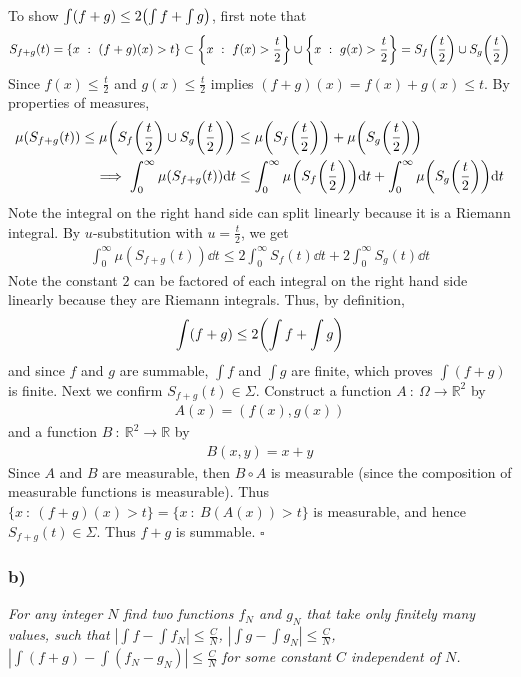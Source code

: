 \documentclass[12pt]{article}
\theoremstyle{plain}
\begin{document}
To show $\int (f + g) \leq 2\qty(\int f + \int g)$, first note that
\begin{align*}
    S_{f + g}(t) = \{x\ :\ (f+g)(x) > t\} \subset \left\{x\ :\ f(x) > \frac{t}{2}\right\} \cup \left\{x\ :\ g(x) > \frac{t}{2}\right\} = S_f\qty(\frac{t}{2}) \cup S_g\qty(\frac{t}{2})
\end{align*}
Since $f(x) \leq \frac{t}{2}$ and $g(x) \leq \frac{t}{2}$ implies $(f + g)(x) = f(x) + g(x) \leq t$.  By properties of measures, 
\begin{align*}
    \mu(S_{f + g}(t)) \leq \mu\qty(S_f\qty(\frac{t}{2}) \cup S_g\qty(\frac{t}{2})) &\leq \mu\qty(S_f\qty(\frac{t}{2})) + \mu\qty(S_g\qty(\frac{t}{2})) \\
    \implies \int_0^\infty \mu(S_{f + g}(t)) \dd t &\leq \int_0^\infty \mu\qty(S_f\qty(\frac{t}{2}))\dd t + \int_0^\infty \mu\qty(S_g\qty(\frac{t}{2}))\dd t
\end{align*}
Note the integral on the right hand side can split linearly because it is a Riemann integral.  By $u$-substitution with $u = \frac{t}{2}$, we get
\begin{align*}
    \int_0^\infty \mu(S_{f + g}(t))\dd t \leq 2\int_0^\infty S_f(t)\dd t + 2\int_0^\infty S_g(t)\dd t
\end{align*}
Note the constant $2$ can be factored of each integral on the right hand side linearly because they are Riemann integrals.  Thus, by definition,
\begin{align*}
    \int (f + g) \leq 2\qty(\int f + \int g)
\end{align*}
and since $f$ and $g$ are summable, $\int f$ and $\int g$ are finite, which proves $\int (f + g)$ is finite.  Next we confirm $S_{f + g}(t) \in \Sigma$.  Construct a function $A\ :\ \Omega \rightarrow \mathbb{R}^2$ by
\begin{align*}
    A(x) = (f(x), g(x))
\end{align*}
and a function $B\ :\ \mathbb{R}^2 \rightarrow \mathbb{R}$ by
\begin{align*}
    B(x, y) = x + y
\end{align*}
Since $A$ and $B$ are measurable, then $B\circ A$ is measurable (since the composition of measurable functions is measurable).  Thus $\{x\ :\ (f + g)(x) > t\} = \{x\ :\ B(A(x)) > t\}$ is measurable, and hence $S_{f + g}(t) \in \Sigma$.  Thus $f + g$ is summable. \hfill $\square$

\subsubsection*{ b)}
\emph{For any integer $N$ find two functions $f_N$ and $g_N$ that take only finitely many values, such that $|\int f - \int f_N| \leq \frac{C}{N}$, $|\int g - \int g_N| \leq \frac{C}{N}$, $|\int(f + g) - \int(f_N - g_N)| \leq \frac{C}{N}$ for some constant $C$ independent of $N$.}
\end{document}
